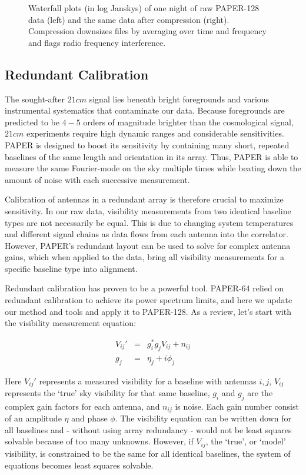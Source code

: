 \documentclass[preprint2,numberedappendix,tighten,twocolappendix]{aastex6}  %
\begin{document}
\begin{figure}[!]
	\centering
	\caption{Waterfall plots (in log Janskys) of one night of raw PAPER-128 data (left) and the same data after compression (right). Compression downsizes files by averaging over time and frequency and flags radio frequency interference.}
	\label{fig:raw}
\end{figure}

\subsection{Redundant Calibration}

The sought-after $21 cm$ signal lies beneath bright foregrounds and various instrumental systematics that contaminate our data. Because foregrounds are predicted to be $4-5$ orders of magnitude brighter than the cosmological signal, $21 cm$ experiments require high dynamic ranges and considerable sensitivities. PAPER is designed to boost its sensitivity by containing many short, repeated baselines of the same length and orientation in its array. Thus, PAPER is able to measure the same Fourier-mode on the sky multiple times while beating down the amount of noise with each successive measurement.

Calibration of antennas in a redundant array is therefore crucial to maximize sensitivity. In our raw data, visibility measurements from two identical baseline types are not necessarily be equal. This is due to changing system temperatures and different signal chains as data flows from each antenna into the correlator. However, PAPER's redundant layout can be used to solve for complex antenna gains, which when applied to the data, bring all visibility measurements for a specific baseline type into alignment. 

Redundant calibration has proven to be a powerful tool. PAPER-64 relied on redundant calibration to achieve its power spectrum limits, and here we update our method and tools and apply it to PAPER-128. As a review, let's start with the visibility measurement equation:

\begin{eqnarray}
\label{viseq}
V_{ij}' &=& g_{i}^{*}g_{j}V_{ij} + n_{ij} \\
g_{j} &=&\eta_{j} + i\phi_{j}
\end{eqnarray}

Here $V_{ij}'$ represents a measured visibility for a baseline with antennas $i,j$, $V_{ij}$ represents the `true' sky visibility for that same baseline, $g_{i}$ and $g_{j}$ are the complex gain factors for each antenna, and $n_{ij}$ is noise. Each gain number consist of an amplitude $\eta$ and phase $\phi$. The visibility equation can be written down for all baselines and - without using array redundancy - would not be least squares solvable because of too many unknowns. However, if $V_{ij}$, the `true', or `model' visibility, is constrained to be the same for all identical baselines, the system of equations becomes least squares solvable.
\end{document}
